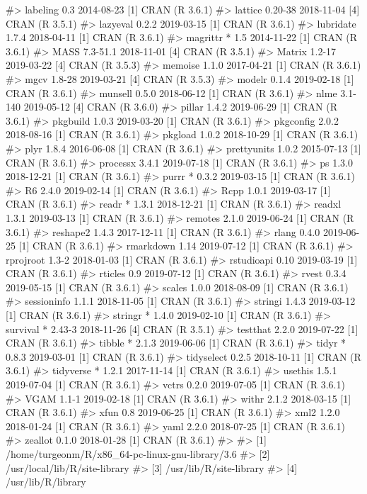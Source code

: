 \documentclass[
]{jss}
\begin{document}
\begin{CodeChunk}
\begin{CodeOutput}
#>  labeling      0.3        2014-08-23 [1] CRAN (R 3.6.1)
#>  lattice       0.20-38    2018-11-04 [4] CRAN (R 3.5.1)
#>  lazyeval      0.2.2      2019-03-15 [1] CRAN (R 3.6.1)
#>  lubridate     1.7.4      2018-04-11 [1] CRAN (R 3.6.1)
#>  magrittr    * 1.5        2014-11-22 [1] CRAN (R 3.6.1)
#>  MASS          7.3-51.1   2018-11-01 [4] CRAN (R 3.5.1)
#>  Matrix        1.2-17     2019-03-22 [4] CRAN (R 3.5.3)
#>  memoise       1.1.0      2017-04-21 [1] CRAN (R 3.6.1)
#>  mgcv          1.8-28     2019-03-21 [4] CRAN (R 3.5.3)
#>  modelr        0.1.4      2019-02-18 [1] CRAN (R 3.6.1)
#>  munsell       0.5.0      2018-06-12 [1] CRAN (R 3.6.1)
#>  nlme          3.1-140    2019-05-12 [4] CRAN (R 3.6.0)
#>  pillar        1.4.2      2019-06-29 [1] CRAN (R 3.6.1)
#>  pkgbuild      1.0.3      2019-03-20 [1] CRAN (R 3.6.1)
#>  pkgconfig     2.0.2      2018-08-16 [1] CRAN (R 3.6.1)
#>  pkgload       1.0.2      2018-10-29 [1] CRAN (R 3.6.1)
#>  plyr          1.8.4      2016-06-08 [1] CRAN (R 3.6.1)
#>  prettyunits   1.0.2      2015-07-13 [1] CRAN (R 3.6.1)
#>  processx      3.4.1      2019-07-18 [1] CRAN (R 3.6.1)
#>  ps            1.3.0      2018-12-21 [1] CRAN (R 3.6.1)
#>  purrr       * 0.3.2      2019-03-15 [1] CRAN (R 3.6.1)
#>  R6            2.4.0      2019-02-14 [1] CRAN (R 3.6.1)
#>  Rcpp          1.0.1      2019-03-17 [1] CRAN (R 3.6.1)
#>  readr       * 1.3.1      2018-12-21 [1] CRAN (R 3.6.1)
#>  readxl        1.3.1      2019-03-13 [1] CRAN (R 3.6.1)
#>  remotes       2.1.0      2019-06-24 [1] CRAN (R 3.6.1)
#>  reshape2      1.4.3      2017-12-11 [1] CRAN (R 3.6.1)
#>  rlang         0.4.0      2019-06-25 [1] CRAN (R 3.6.1)
#>  rmarkdown     1.14       2019-07-12 [1] CRAN (R 3.6.1)
#>  rprojroot     1.3-2      2018-01-03 [1] CRAN (R 3.6.1)
#>  rstudioapi    0.10       2019-03-19 [1] CRAN (R 3.6.1)
#>  rticles       0.9        2019-07-12 [1] CRAN (R 3.6.1)
#>  rvest         0.3.4      2019-05-15 [1] CRAN (R 3.6.1)
#>  scales        1.0.0      2018-08-09 [1] CRAN (R 3.6.1)
#>  sessioninfo   1.1.1      2018-11-05 [1] CRAN (R 3.6.1)
#>  stringi       1.4.3      2019-03-12 [1] CRAN (R 3.6.1)
#>  stringr     * 1.4.0      2019-02-10 [1] CRAN (R 3.6.1)
#>  survival    * 2.43-3     2018-11-26 [4] CRAN (R 3.5.1)
#>  testthat      2.2.0      2019-07-22 [1] CRAN (R 3.6.1)
#>  tibble      * 2.1.3      2019-06-06 [1] CRAN (R 3.6.1)
#>  tidyr       * 0.8.3      2019-03-01 [1] CRAN (R 3.6.1)
#>  tidyselect    0.2.5      2018-10-11 [1] CRAN (R 3.6.1)
#>  tidyverse   * 1.2.1      2017-11-14 [1] CRAN (R 3.6.1)
#>  usethis       1.5.1      2019-07-04 [1] CRAN (R 3.6.1)
#>  vctrs         0.2.0      2019-07-05 [1] CRAN (R 3.6.1)
#>  VGAM          1.1-1      2019-02-18 [1] CRAN (R 3.6.1)
#>  withr         2.1.2      2018-03-15 [1] CRAN (R 3.6.1)
#>  xfun          0.8        2019-06-25 [1] CRAN (R 3.6.1)
#>  xml2          1.2.0      2018-01-24 [1] CRAN (R 3.6.1)
#>  yaml          2.2.0      2018-07-25 [1] CRAN (R 3.6.1)
#>  zeallot       0.1.0      2018-01-28 [1] CRAN (R 3.6.1)
#> 
#> [1] /home/turgeonm/R/x86_64-pc-linux-gnu-library/3.6
#> [2] /usr/local/lib/R/site-library
#> [3] /usr/lib/R/site-library
#> [4] /usr/lib/R/library
\end{CodeOutput}
\end{CodeChunk}
\end{document}
